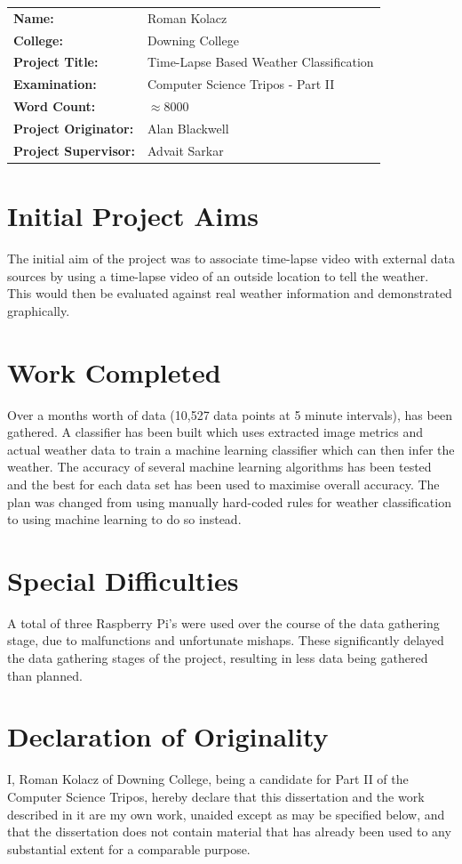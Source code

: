 \documentclass[a4paper,12pt,twoside]{report}
\begin{document}
\begin{tabular}{ll}
  \bf Name: & Roman Kolacz \\
  \bf College: & Downing College \\
  \bf Project Title: & Time-Lapse Based Weather Classification \\
  \bf Examination: & Computer Science Tripos - Part II \\
  \bf Word Count: & $\approx 8000$ \\
  \bf Project Originator: & Alan Blackwell \\
  \bf Project Supervisor: & Advait Sarkar \\
\end{tabular}

\section*{Initial Project Aims}
The initial aim of the project was to associate time-lapse video with external data sources by using a time-lapse video of an outside location to tell the weather. This would then be evaluated against real weather information and demonstrated graphically.

\section*{Work Completed}
Over a months worth of data (10,527 data points at 5 minute intervals), has been gathered. A classifier has been built which uses extracted image metrics and actual weather data to train a machine learning classifier which can then infer the weather.
The accuracy of several machine learning algorithms has been tested and the best for each data set has been used to maximise overall accuracy. 
The plan was changed from using manually hard-coded rules for weather classification to using machine learning to do so instead.

\section*{Special Difficulties}
A total of three Raspberry Pi's were used over the course of the data gathering stage, due to malfunctions and unfortunate mishaps. These significantly delayed the data gathering stages of the project, resulting in less data being gathered than planned.

\section*{Declaration of Originality}
I, Roman Kolacz of Downing College, being a candidate for Part II of the Computer Science Tripos, hereby declare that this dissertation and the work described in it are my own work, unaided except as may be specified below, and that the dissertation does not contain material that has already been used to any substantial extent for a comparable purpose.
\end{document}
